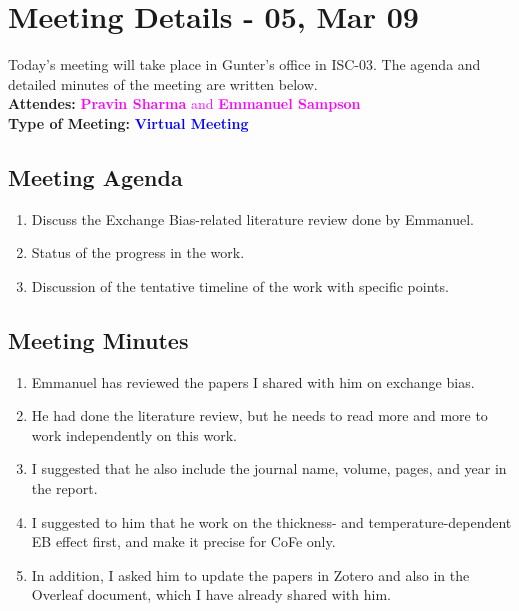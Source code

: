 \section{Meeting Details - 05, Mar 09 }
\label{chap:Meeting_05}
Today's meeting will take place in Gunter's office in ISC-03. The agenda and detailed minutes of the meeting are written below.
\\ \textbf{Attendes:}
\textcolor{magenta}{\textbf{Pravin Sharma} and \textbf{Emmanuel Sampson}}
\\ \textbf{Type of Meeting:}
\textcolor{blue}{\textbf{Virtual Meeting} }
\subsection*{Meeting Agenda}
\begin{enumerate}
    \item Discuss the Exchange Bias-related literature review done by Emmanuel.
    \item Status of the progress in the work.
    \item Discussion of the tentative timeline of the work with specific points.
\end{enumerate}
\subsection*{Meeting Minutes}
\begin{enumerate}
    \item Emmanuel has reviewed the papers I shared with him on exchange bias.
    \item He had done the literature review, but he needs to read more and more to work independently on this work. 
    \item I suggested that he also include the journal name, volume, pages, and year in the report.
    \item I suggested to him that he work on the thickness- and temperature-dependent EB effect first, and make it precise for CoFe only.
    \item In addition, I asked him to update the papers in Zotero and also in the Overleaf document, which I have already shared with him. 
\end{enumerate}